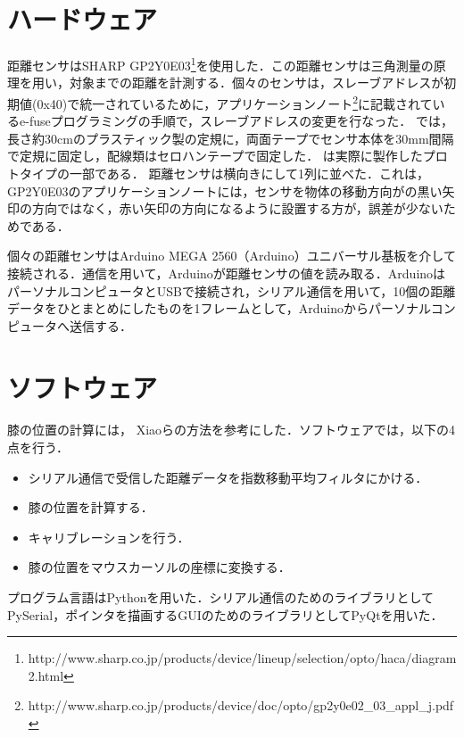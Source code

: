\section{ハードウェア}
距離センサはSHARP GP2Y0E03\footnote{http://www.sharp.co.jp/products/device/lineup/selection/opto/haca/diagram2.html}を使用した．この距離センサは三角測量の原理を用い，対象までの距離を計測する．個々のセンサは，スレーブアドレスが初期値(0x40)で統一されているために，アプリケーションノート\footnote{http://www.sharp.co.jp/products/device/doc/opto/gp2y0e02\_03\_appl\_j.pdf}に記載されているe-fuseプログラミングの手順で，スレーブアドレスの変更を行なった．
\SysName では，長さ約30\si{cm}のプラスティック製の定規に，両面テープでセンサ本体を30\si{mm}間隔で定規に固定し，配線類はセロハンテープで固定した．
は実際に製作したプロトタイプの一部である．
距離センサは横向きにして1列に並べた．これは，GP2Y0E03のアプリケーションノート\footnotemark[2]には，センサを物体の移動方向がの黒い矢印の方向ではなく，赤い矢印の方向になるように設置する方が，誤差が少ないためである．
\par
個々の距離センサはArduino MEGA 2560（Arduino）ユニバーサル基板を介して接続される．\iic 通信を用いて，Arduinoが距離センサの値を読み取る．ArduinoはパーソナルコンピュータとUSBで接続され，シリアル通信を用いて，10個の距離データをひとまとめにしたものを1フレームとして，Arduinoからパーソナルコンピュータへ送信する．
\section{ソフトウェア} 
膝の位置の計算には，
Xiaoら\cite{Xiao:2018:LOP:3173574.3173669}の方法を参考にした．ソフトウェアでは，以下の4点を行う．
\begin{itemize}
	\item シリアル通信で受信した距離データを指数移動平均フィルタにかける．
	\item 膝の位置を計算する．
	\item キャリブレーションを行う．
	\item 膝の位置をマウスカーソルの座標に変換する．
\end{itemize}
プログラム言語はPythonを用いた．シリアル通信のためのライブラリとしてPySerial，ポインタを描画するGUIのためのライブラリとしてPyQtを用いた．
